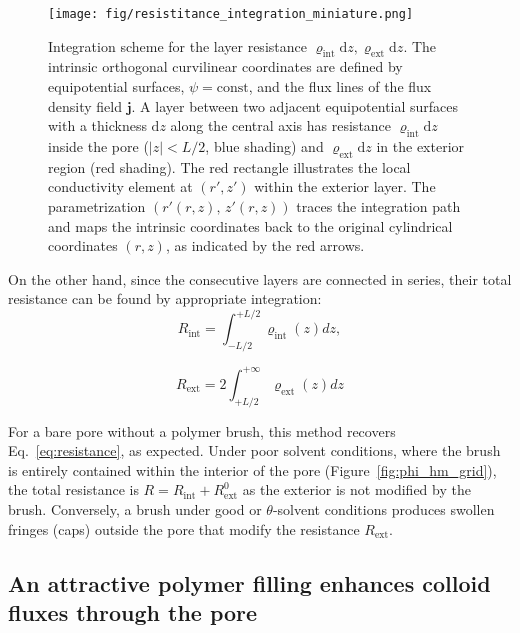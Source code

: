 \documentclass[12pt, a4paper]{article}
\begin{document}
\begin{figure}
    \centering
    \texttt{[image: fig/resistitance\_integration\_miniature.png]}
    \caption{
    Integration scheme for the layer resistance $\varrho_{\text{int}}\text{d}z, \varrho_{\text{ext}}\text{d}z$.  
    The intrinsic orthogonal curvilinear coordinates are defined by equipotential surfaces, \mbox{$\psi = \text{const}$}, and the flux lines of the flux density field $\bm{j}$.
    A layer between two adjacent equipotential surfaces with a thickness $\text{d}z$ along the central axis has resistance $\varrho_{\text{int}}\text{d}z$ inside the pore ($|z|<L/2$, blue shading) and $\varrho_{\text{ext}}\text{d}z$ in the exterior region (red shading).  
    The red rectangle illustrates the local conductivity element at $(r',z')$ within the exterior layer.  
    The parametrization $(r'(r,z),\,z'(r,z))$ traces the integration path and maps the intrinsic coordinates back to the original cylindrical coordinates $(r,z)$, as indicated by the red arrows.
    }
    \label{fig:integration_scheme}
\end{figure}

On the other hand, since the consecutive layers are connected in series, their total resistance can be found by appropriate integration:
\begin{equation}
    R_{\text{int}} = \int_{-L/2}^{+L/2}\varrho_{\text{int}}(z) dz,
    \label{R_int}
\end{equation}

\begin{equation}
   R_{\text{ext}} =2\int_{+L/2}^{+\infty}\varrho_{\text{ext}}(z)dz
    \label{R_ext}
\end{equation}

For a bare pore without a polymer brush, this method recovers Eq.~\ref{eq:resistance}, as expected.
Under poor solvent conditions, where the brush is entirely contained within the interior of the pore (Figure~\ref{fig:phi_hm_grid}), the total resistance is $R = R_{\text{int}} + R_{\text{ext}}^{0}$ as the exterior is not modified by the brush.
Conversely, a brush under good or $\theta$-solvent conditions produces swollen fringes (caps) outside the pore that modify the resistance $R_{\text{ext}}$.


\subsection{An attractive polymer filling enhances colloid fluxes through the pore}
\end{document}
